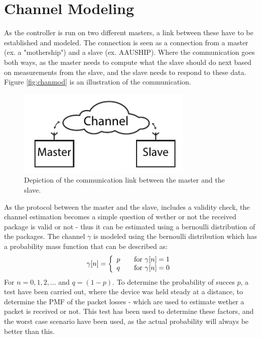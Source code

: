 \chapter{Channel Modeling}
As the controller is run on two different masters, a link between these have to be established and modeled. The connection is seen as a connection from a master (ex. a "mothership") and a slave (ex. AAUSHIP). Where the communication goes both ways, as the master needs to compute what the slave should do next based on measurements from the slave, and the slave needs to respond to these data. Figure \vref{fig:chanmod} is an illustration of the communication. 

\begin{figure}[htbp]
		\begin{center}
			\includegraphics[width=8.4cm]{img/chanmod}
			\caption{Depiction of the communication link between the master and the slave.}
			\label{fig:chanmod}
		\end{center}
\end{figure}

As the protocol between the master and the slave, includes a validity check, the channel estimation becomes a simple question of wether or not the received package is valid or not - thus it can be estimated using a bernoulli distribution of the packages. The channel $\gamma$ is modeled using the bernoulli distribution which has a probability mass function that can be described as:
\begin{align}
\gamma[n] = 
\left\{ 
  \begin{array}{l l}
    p & \quad \text{for}\,\, \gamma[n] = 1\\
    q & \quad \text{for}\,\, \gamma[n] = 0
  \end{array} \right.
\end{align}
For $n = 0,1,2,\dots$ and $q = (1-p)$. To determine the probability of succes $p$, a test have been carried out, where the device was held steady at a distance, to determine the PMF of the packet losses - which are used to estimate wether a packet is received or not. This test has been used to determine these factors, and the worst case scenario have been used, as the actual probability will always be better than this. 

